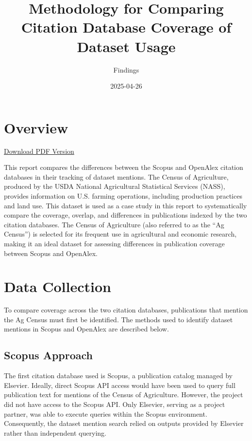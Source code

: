 \documentclass[
  letterpaper,
  DIV=11,
  numbers=noendperiod]{scrartcl}
\title{Methodology for Comparing Citation Database Coverage of Dataset
Usage}
\subtitle{Findings}
\author{}
\date{2025-04-26}
\renewcommand*\contentsname{Table of contents}
\newcommand\contentsname{Table of contents}
\begin{document}
\maketitle

\renewcommand*\contentsname{Table of contents}
{
\hypersetup{linkcolor=}
\setcounter{tocdepth}{3}
\tableofcontents
}

\section{Overview}\label{overview}

\href{report.pdf}{Download PDF Version}

This report compares the differences between the Scopus and OpenAlex
citation databases in their tracking of dataset mentions. The Census of
Agriculture, produced by the USDA National Agricultural Statistical
Services (NASS), provides information on U.S. farming operations,
including production practices and land use. This dataset is used as a
case study in this report to systematically compare the coverage,
overlap, and differences in publications indexed by the two citation
databases. The Census of Agriculture (also referred to as the ``Ag
Census'') is selected for its frequent use in agricultural and economic
research, making it an ideal dataset for assessing differences in
publication coverage between Scopus and OpenAlex.

\section{Data Collection}\label{data-collection}

To compare coverage across the two citation databases, publications that
mention the Ag Census must first be identified. The methods used to
identify dataset mentions in Scopus and OpenAlex are described below.

\subsection{Scopus Approach}\label{scopus-approach}

The first citation database used is Scopus, a publication catalog
managed by Elsevier. Ideally, direct Scopus API access would have been
used to query full publication text for mentions of the Census of
Agriculture. However, the project did not have access to the Scopus API.
Only Elsevier, serving as a project partner, was able to execute queries
within the Scopus environment. Consequently, the dataset mention search
relied on outputs provided by Elsevier rather than independent querying.
\end{document}
